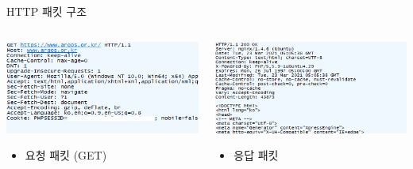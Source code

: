 \documentclass{beamer}
\begin{document}
    \begin{frame}{HTTP 패킷 구조}
        \begin{columns}
            \begin{column}{.5\textwidth}
                \begin{center}
                    \includegraphics[width=\textwidth]{Images/request_http.png} 
                \end{center}
                
                \begin{itemize}
                    \item 요청 패킷 (GET)
                \end{itemize}                
            \end{column}
            \begin{column}{.5\textwidth}
                \begin{center}
                    \includegraphics[width=\textwidth]{Images/response_http.png} 
                \end{center}
                \begin{itemize}
                    \item 응답 패킷
                \end{itemize}
            \end{column}
        \end{columns}
    \end{frame}
\end{document}
